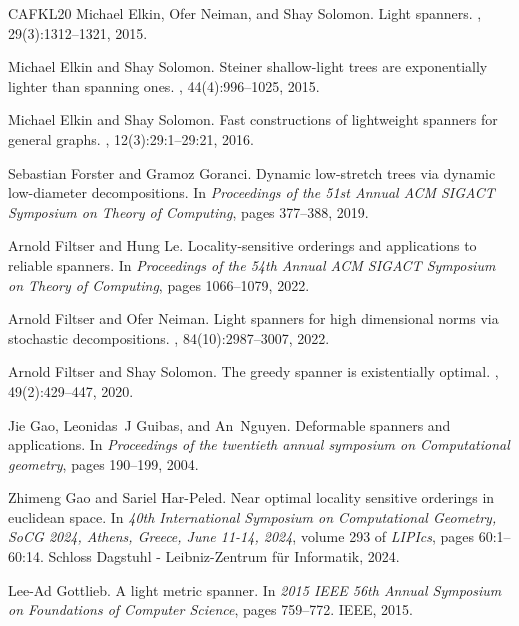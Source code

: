 \documentclass[11pt]{article}
\begin{document}
\begin{thebibliography}{CAFKL20}
Michael Elkin, Ofer Neiman, and Shay Solomon.
\newblock Light spanners.
, 29(3):1312--1321, 2015.

Michael Elkin and Shay Solomon.
\newblock Steiner shallow-light trees are exponentially lighter than spanning
  ones.
, 44(4):996--1025, 2015.

Michael Elkin and Shay Solomon.
\newblock Fast constructions of lightweight spanners for general graphs.
, 12(3):29:1--29:21, 2016.

Sebastian Forster and Gramoz Goranci.
\newblock Dynamic low-stretch trees via dynamic low-diameter decompositions.
\newblock In {\em Proceedings of the 51st Annual ACM SIGACT Symposium on Theory
  of Computing}, pages 377--388, 2019.

Arnold Filtser and Hung Le.
\newblock Locality-sensitive orderings and applications to reliable spanners.
\newblock In {\em Proceedings of the 54th Annual ACM SIGACT Symposium on Theory
  of Computing}, pages 1066--1079, 2022.

Arnold Filtser and Ofer Neiman.
\newblock Light spanners for high dimensional norms via stochastic
  decompositions.
, 84(10):2987--3007, 2022.

Arnold Filtser and Shay Solomon.
\newblock The greedy spanner is existentially optimal.
, 49(2):429--447, 2020.

Jie Gao, Leonidas~J Guibas, and An~Nguyen.
\newblock Deformable spanners and applications.
\newblock In {\em Proceedings of the twentieth annual symposium on
  Computational geometry}, pages 190--199, 2004.

Zhimeng Gao and Sariel Har{-}Peled.
\newblock Near optimal locality sensitive orderings in euclidean space.
\newblock In {\em 40th International Symposium on Computational Geometry, SoCG
  2024, Athens, Greece, June 11-14, 2024}, volume 293 of {\em LIPIcs}, pages
  60:1--60:14. Schloss Dagstuhl - Leibniz-Zentrum f{\"{u}}r Informatik, 2024.

Lee-Ad Gottlieb.
\newblock A light metric spanner.
\newblock In {\em 2015 IEEE 56th Annual Symposium on Foundations of Computer
  Science}, pages 759--772. IEEE, 2015.


\end{thebibliography}
\end{document}
